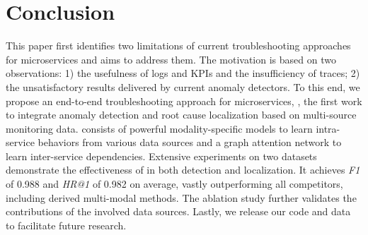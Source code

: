\section{Conclusion}
This paper first identifies two limitations of current troubleshooting approaches for microservices and aims to address them. The motivation is based on two observations: 1) the usefulness of logs and KPIs and the insufficiency of traces; 2) the unsatisfactory results delivered by current anomaly detectors.
To this end, we propose an end-to-end troubleshooting approach for microservices, \name, the first work to integrate anomaly detection and root cause localization based on multi-source monitoring data.
\name consists of powerful modality-specific models to learn intra-service behaviors from various data sources and a graph attention network to learn inter-service dependencies.
Extensive experiments on two datasets demonstrate the effectiveness of \name in both detection and localization. 
It achieves \textit{F1} of 0.988 and \textit{HR@1} of 0.982 on average, vastly outperforming all competitors, including derived multi-modal methods.
The ablation study further validates the contributions of the involved data sources.
Lastly, we release our code and data to facilitate future research.
